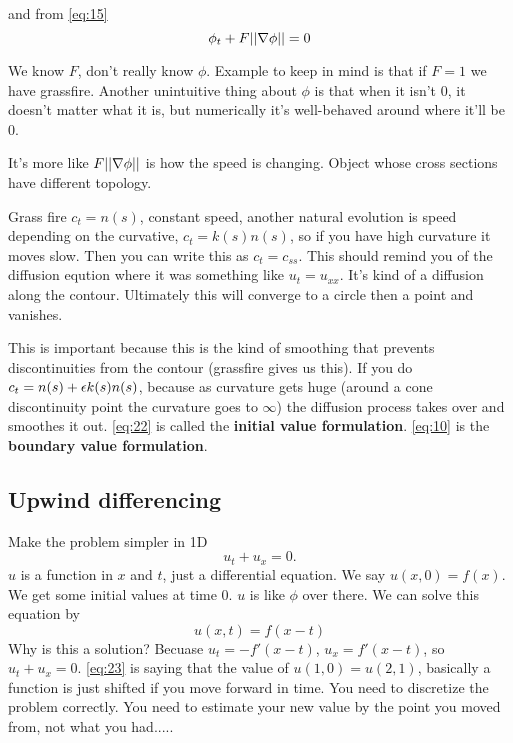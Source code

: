 and  from \eqref{eq:15}
\begin{equation}
  \label{eq:22}
\phi_t + F||\nabla \phi || =0  
\end{equation}

We know $F$, don't really know $\phi$. Example to keep in mind is that
if $F=1$ we have grassfire. 
Another unintuitive thing about $\phi$ is that when it isn't 0, it
doesn't matter what it is, but numerically it's well-behaved around
where it'll be 0.

It's more like $F||\nabla \phi ||$ is how the speed is changing. Object
whose cross sections have different topology.

Grass fire $c_t = n(s)$, constant speed, another natural evolution
is speed depending on the curvative, $c_t = k(s)n(s)$, so if you have high curvature
it moves slow. Then  you can write this as $c_t = c_{ss}$. This should
remind you of the diffusion eqution where it was something like $u_t =
u_{xx}$. It's kind of a diffusion along the contour. Ultimately this
will converge to a circle then a point and vanishes.

This is important because this is the kind of smoothing that prevents
discontinuities from the contour (grassfire gives us this). If you do
$c_t = n(s) +\epsilon k(s)n(s)$, because as curvature gets huge (around a
cone discontinuity point the curvature goes to $\infty$) the diffusion
process takes over and smoothes it out.  \eqref{eq:22} is called the
\textbf{initial value formulation}. \eqref{eq:10} is the \textbf{boundary
value formulation}.

\subsection{Upwind differencing}
\label{sec:upwind-differencing}
Make the problem simpler in 1D $$u_t + u_x = 0.$$ $u$ is a function in $x$ and
$t$, just a differential equation. We say $u(x,0) = f(x)$. We get some
initial values at time 0. $u$ is like $\phi$ over there. We can solve
this equation by
\begin{equation}
  \label{eq:23}
u(x,t) = f(x-t)  
\end{equation} Why is this a solution? Becuase
$u_t = -f'(x-t)$, $u_x = f'(x-t)$, so $u_t+u_x = 0$. \eqref{eq:23} is
saying that the
value of $u(1,0) = u(2,1)$, basically a function is just shifted if
you move forward in time. You need to discretize the problem
correctly. You need to estimate your new value by the point you moved
from, not what you had.....



